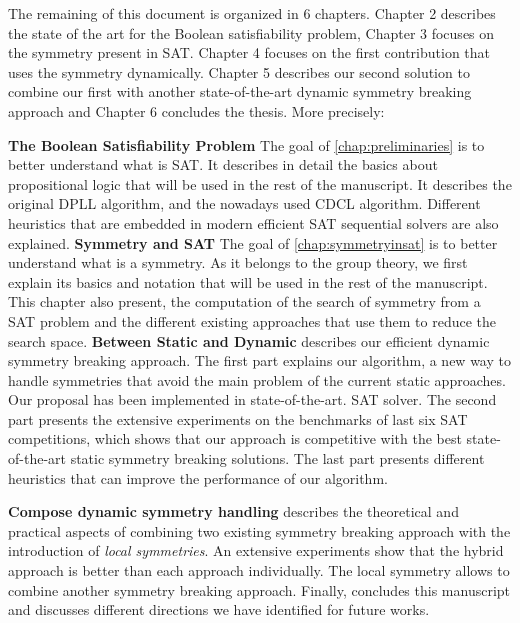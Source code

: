 The remaining of this document is organized in 6 chapters. Chapter 2 describes the state of
the art for the Boolean satisfiability problem, Chapter 3 focuses on the symmetry present in SAT.
Chapter 4 focuses on the first contribution that uses the symmetry dynamically.
Chapter 5 describes our second solution to combine our first with another state-of-the-art  
dynamic symmetry breaking approach and Chapter 6 concludes the thesis. More precisely:
 
\textbf{The Boolean Satisfiability Problem}
The goal of \cref{chap:preliminaries} is to better understand what is SAT. It describes in detail
the basics about propositional logic that will be used in the rest of the manuscript. 
It describes the original DPLL algorithm, and the nowadays used CDCL algorithm.
Different heuristics that are embedded in modern efficient SAT sequential solvers are also explained. 
\textbf{Symmetry and SAT}
The goal of \cref{chap:symmetryinsat} is to better understand what is a symmetry. As it belongs to the 
group theory, we first explain its basics and notation that will be used in the rest of the manuscript.
This chapter also present, the computation of the search of symmetry from a SAT problem and 
the different existing approaches that use them to reduce the search space.
\textbf{Between Static and Dynamic}
 describes our efficient dynamic symmetry breaking approach.
The first part explains our algorithm, a new way to handle symmetries that avoid the main problem
of the current static approaches. Our proposal has been implemented in state-of-the-art.
SAT solver. The second part presents the extensive experiments on the benchmarks of last six SAT competitions,
which shows that our approach is competitive with the best state-of-the-art static symmetry breaking solutions.
The last part presents different heuristics that can improve the performance of our algorithm.

\textbf{Compose dynamic symmetry handling}
 describes the theoretical and practical aspects of combining two existing
symmetry  breaking approach with the introduction of \textit{local symmetries}.
 An extensive experiments show that the hybrid approach is better than 
each approach individually. The local symmetry allows to combine another 
symmetry breaking approach.
Finally,  concludes this manuscript and discusses different directions we have identified for future works.
 
